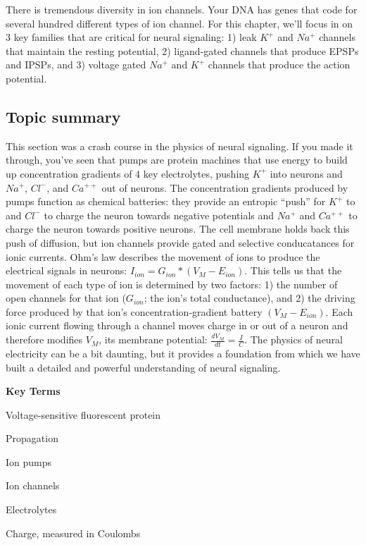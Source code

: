 \documentclass[
]{book}
\begin{document}
There is tremendous diversity in ion channels. Your DNA has genes that code for several hundred different types of ion channel. For this chapter, we'll focus in on 3 key families that are critical for neural signaling: 1) leak \(K^+\) and \(Na^+\) channels that maintain the resting potential, 2) ligand-gated channels that produce EPSPs and IPSPs, and 3) voltage gated \(Na^+\) and \(K^+\) channels that produce the action potential.

\hypertarget{topic-summary-2}{%
\subsection{Topic summary}\label{topic-summary-2}}

This section was a crash course in the physics of neural signaling. If you made it through, you've seen that pumps are protein machines that use energy to build up concentration gradients of 4 key electrolytes, pushing \(K^+\) into neurons and \(Na^+\), \(Cl^{-}\), and \(Ca^{++}\) out of neurons. The concentration gradients produced by pumps function as chemical batteries: they provide an entropic ``push'' for \(K^+\) to and \(Cl^{-}\) to charge the neuron towards negative potentials and \(Na^+\) and \(Ca^{++}\) to charge the neuron towards positive neurons. The cell membrane holds back this push of diffusion, but ion channels provide gated and selective conducatances for ionic currents. Ohm's law describes the movement of ions to produce the electrical signals in neurons: \(I_{ion} = G_{ion} * (V_{M} - E_{ion})\). This tells us that the movement of each type of ion is determined by two factors: 1) the number of open channels for that ion (\(G_{ion}\); the ion's total conductance), and 2) the driving force produced by that ion's concentration-gradient battery \((V_{M} - E_{ion})\). Each ionic current flowing through a channel moves charge in or out of a neuron and therefore modifies \(V_{M}\), its membrane potential: \(\frac{dV_{M}}{dt} = \frac{I}{C}\). The physics of neural electricity can be a bit daunting, but it provides a foundation from which we have built a detailed and powerful understanding of neural signaling.

\textbf{Key Terms}

Voltage-sensitive fluorescent protein

Propagation

Ion pumps

Ion channels

Electrolytes

Charge, measured in Coulombs
\end{document}
